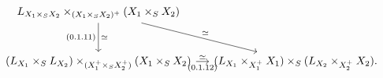 \[
\begin{tikzcd}[column sep=small,row sep=large]
  L_{X_1\times_S X_2}
    \times_{(X_1\times_S X_2)^+}
    (X_1\times_S X_2)
    \arrow[d,"\simeq","{\scriptstyle(0.1.11)}"']
    \arrow[dr,"\simeq"]
  &
  {}
  \\
  (L_{X_1}\times_S L_{X_2})
    \times_{(X_1^+\times_S X_2^+)}
    (X_1\times_S X_2)
    \arrow[r,"\simeq","{\scriptstyle(0.1.12)}"']
  &
  (L_{X_1}\times_{X_1^+}X_1)
    \times_S
    (L_{X_2}\times_{X_2^+}X_2).
\end{tikzcd}
\]
